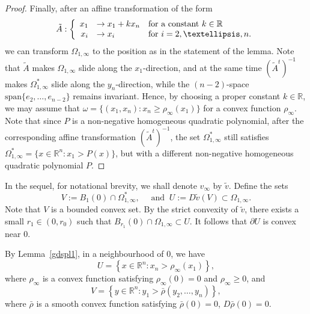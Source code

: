 \documentclass[11pt]{amsart}
\theoremstyle{plain}
\newcommand{\0}{\textbf{0}}
\numberwithin{equation}{section}
\numberwithin{equation}{section}
\numberwithin{figure}{section}
\begin{document}
\begin{proof}
Finally, after an affine transformation of the form
\begin{equation*}
\tilde{A}: \left\{ \begin{array}{rll}
x_1 &\to x_1 + k x_n & \text{for a constant \( k \in \mathbb{R} \)} \\
x_i &\to x_i & \text{for } i = 2, \ldots, n.
\end{array}
\right.
\end{equation*}
we can transform \(\Omega_{1,\infty}\) to the position as in the statement of the lemma.
Note that \(\tilde{A}\) makes \(\Omega_{1,\infty}\) slide along the \(x_1\)-direction, and at the same time \((\tilde{A}^t)^{-1}\) makes \(\Omega^*_{1,\infty}\) slide along the \(y_n\)-direction, while the \((n-2)\)-space \(\text{span}\{e_2, \ldots, e_{n-2}\}\) remains invariant.
Hence, by choosing a proper constant \( k \in \mathbb{R} \), we may assume that \(\omega = \{ (x_1, x_n) : x_n \geq \rho_\infty(x_1) \}\) for a convex function \(\rho_\infty\). Note that since \( P \) is a non-negative homogeneous quadratic polynomial, after the corresponding affine transformation \((\tilde{A}^t)^{-1}\), the set \(\Omega^*_{1,\infty}\) still satisfies \(\Omega_{1,\infty}^* = \{ x \in \mathbb{R}^n : x_1 > P(x) \}\), but with a different non-negative homogeneous quadratic polynomial \( P \).
\end{proof}



In the sequel, for notational brevity, we shall denote \( v_\infty \)  by \( \tilde{v} \). Define the sets 
	\[ V := B_1(0)\cap\Omega^*_{1,\infty}, \quad\text{ and }\  U := D\tilde{v} (V) \subset \Omega_{1,\infty}. \]
Note that $V$ is a bounded convex set.
By the strict convexity of $\tilde v$, there exists a small \( r_1 \in (0, r_0) \) such that \( B_{r_1}(0) \cap \Omega_{1,\infty} \subset U \). It follows that $\partial U$ is convex near $0.$

By Lemma~\ref{gdspl1}, in a neighbourhood of \(0\), we have 
\begin{equation}\label{partialU}
U = \left\{x \in \mathbb{R}^n : x_n > \rho_\infty(x_1)\right\},
\end{equation}
where \(\rho_\infty\) is a convex function satisfying \(\rho_\infty(0) = 0\) and \(\rho_\infty \geq 0\), and
\begin{equation}\label{partialV}
V = \left\{y \in \mathbb{R}^n : y_1 > \bar{\rho}(y_2, \ldots, y_n)\right\},
\end{equation}
where \(\bar{\rho}\) is a smooth convex function satisfying \(\bar{\rho}(0) = 0\), \(D\bar{\rho}(0) = 0\).
\end{document}
